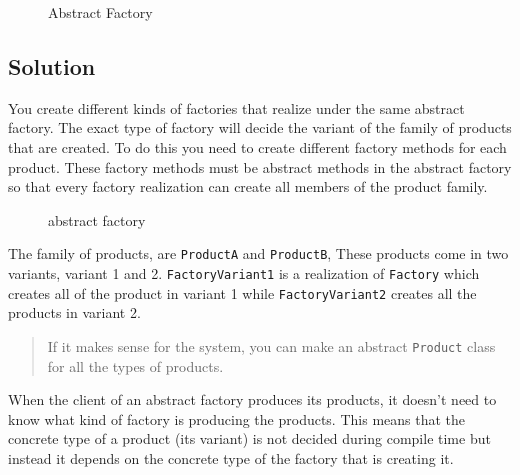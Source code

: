 \begin{figure}
\centering
{}
\caption{Abstract Factory}
\end{figure}

\subsection{Solution}\label{creational-patterns.md__solution-1}

You create different kinds of factories that realize under the same
abstract factory. The exact type of factory will decide the variant of
the family of products that are created. To do this you need to create
different factory methods for each product. These factory methods must
be abstract methods in the abstract factory so that every factory
realization can create all members of the product family.

\begin{figure}
\centering
\pandocbounded{}
\caption{abstract factory}
\end{figure}

The family of products, are \texttt{ProductA} and \texttt{ProductB},
These products come in two variants, variant 1 and 2.
\texttt{FactoryVariant1} is a realization of \texttt{Factory} which
creates all of the product in variant 1 while \texttt{FactoryVariant2}
creates all the products in variant 2.

\begin{quote}
If it makes sense for the system, you can make an abstract
\texttt{Product} class for all the types of products.
\end{quote}

When the client of an abstract factory produces its products, it doesn't
need to know what kind of factory is producing the products. This means
that the concrete type of a product (its variant) is not decided during
compile time but instead it depends on the concrete type of the factory
that is creating it.

